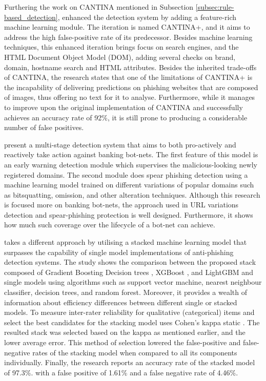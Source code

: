 Furthering the work on CANTINA mentioned in Subsection \ref{subsec:rule-based_detection}, \cite{Guang_Xiang} enhanced the detection system by adding a feature-rich machine learning module. The iteration is named CANTINA+, and it aims to address the high false-positive rate of its predecessor. Besides machine learning techniques, this enhanced iteration brings focus on search engines, and the HTML Document Object Model (DOM), adding several checks on brand, domain, hostname search and HTML attributes. Besides the inherited trade-offs of CANTINA, the research states that one of the limitations of CANTINA+ is the incapability of delivering predictions on phishing websites that are composed of images, thus offering no text for it to analyse. Furthermore, while it manages to improve upon the original implementation of CANTINA and successfully achieves an accuracy rate of 92\%, it is still prone to producing a considerable number of false positives.

\cite{Ling_Li} present a multi-stage detection system that aims to both pro-actively and reactively take action against banking bot-nets. The first feature of this model is an early warning detection module which supervises the malicious-looking newly registered domains. The second module does spear phishing detection using a machine learning model trained on different variations of popular domains such as bitsquatting, omission, and other alteration techniques. Although this research is focused more on banking bot-nets, the approach used in URL variations detection and spear-phishing protection is well designed. Furthermore, it shows how much such coverage over the lifecycle of a bot-net can achieve.

\cite{Li_Yukun} takes a different approach by utilising a stacked machine learning model that surpasses the capability of single model implementations of anti-phishing detection systems. The study shows the comparison between the proposed stack composed of Gradient Boosting Decision trees \citep{Jerome_Friedman}, XGBoost \citep{Tianqi_Chen}, and LightGBM \citep{Guolin_Ke} and single models using algorithms such as support vector machine, nearest neighbour classifier, decision trees, and random forest. Moreover, it provides a wealth of information about efficiency differences between different single or stacked models. To measure inter-rater reliability for qualitative (categorical) items and select the best candidates for the stacking model \cite{Li_Yukun} uses Cohen's kappa static \citep{Ian_Witten}. The resulted stack was selected based on the kappa as mentioned earlier, and the lower average error.
This method of selection lowered the false-positive and false-negative rates of the stacking model when compared to all its components individually. Finally, the research reports an accuracy rate of the stacked
model of 97.3\%. with a false positive of 1.61\% and a false negative rate of
4.46\%.

